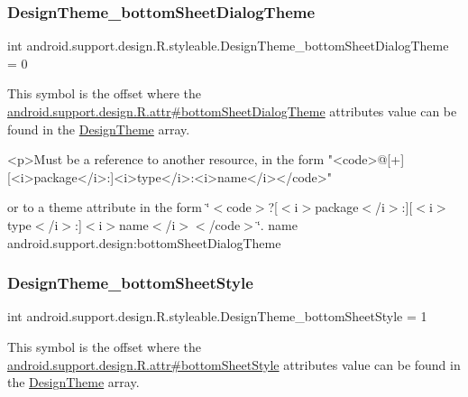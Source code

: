 \subsubsection{\texorpdfstring{Design\+Theme\+\_\+bottom\+Sheet\+Dialog\+Theme}{DesignTheme\_bottomSheetDialogTheme}}
{\footnotesize\ttfamily int android.\+support.\+design.\+R.\+styleable.\+Design\+Theme\+\_\+bottom\+Sheet\+Dialog\+Theme = 0\hspace{0.3cm}{\ttfamily [static]}}

This symbol is the offset where the \hyperlink{classandroid_1_1support_1_1design_1_1R_1_1attr_ac640b00f619be3b2138da92e008fbe7a}{android.\+support.\+design.\+R.\+attr\#bottom\+Sheet\+Dialog\+Theme} attribute\textquotesingle{}s value can be found in the \hyperlink{classandroid_1_1support_1_1design_1_1R_1_1styleable_a340277a41103d3ce86cf1861cc50c1c9}{Design\+Theme} array.

\begin{DoxyVerb}      <p>Must be a reference to another resource, in the form "<code>@[+][<i>package</i>:]<i>type</i>:<i>name</i></code>"
\end{DoxyVerb}
 or to a theme attribute in the form \char`\"{}$<$code$>$?\mbox{[}$<$i$>$package$<$/i$>$\+:\mbox{]}\mbox{[}$<$i$>$type$<$/i$>$\+:\mbox{]}$<$i$>$name$<$/i$>$$<$/code$>$\char`\"{}.  name android.\+support.\+design\+:bottom\+Sheet\+Dialog\+Theme \mbox{\label{classandroid_1_1support_1_1design_1_1R_1_1styleable_a1c6c9dd91389f33d763839d8c0b2dfbe}} 
\subsubsection{\texorpdfstring{Design\+Theme\+\_\+bottom\+Sheet\+Style}{DesignTheme\_bottomSheetStyle}}
{\footnotesize\ttfamily int android.\+support.\+design.\+R.\+styleable.\+Design\+Theme\+\_\+bottom\+Sheet\+Style = 1\hspace{0.3cm}{\ttfamily [static]}}

This symbol is the offset where the \hyperlink{classandroid_1_1support_1_1design_1_1R_1_1attr_a3d3267a3d987f32f59a02f0985be6a5c}{android.\+support.\+design.\+R.\+attr\#bottom\+Sheet\+Style} attribute\textquotesingle{}s value can be found in the \hyperlink{classandroid_1_1support_1_1design_1_1R_1_1styleable_a340277a41103d3ce86cf1861cc50c1c9}{Design\+Theme} array.


